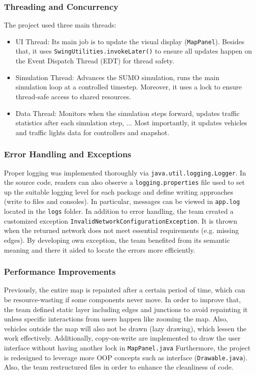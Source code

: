\documentclass[a4paper, 12pt]{article}
\begin{document}
\subsubsection{Threading and Concurrency}
The project used three main threads:
\begin{itemize}
    \item UI Thread: Its main job is to update the visual display (\verb|MapPanel|). Besides that, it uses \verb|SwingUtilities.invokeLater()| to ensure all updates happen on the Event Dispatch Thread (EDT) for thread safety.
    \item Simulation Thread: Advances the SUMO simulation, runs the main simulation loop at a controlled timestep. Moreover, it uses a lock to ensure thread-safe access to shared resources.
    \item Data Thread: Monitors when the simulation steps forward, updates traffic statistics after each simulation step, ... Most importantly, it updates vehicles and traffic lights data for controllers and snapshot.
\end{itemize}
\subsubsection{Error Handling and Exceptions}
Proper logging was implemented thoroughly via \verb|java.util.logging.Logger|. In the source code, readers can also observe a \verb|logging.properties| file used to set up the suitable logging level for each package and define writing approaches (write to files and consoles). In particular, messages can be viewed in \verb|app.log| located in the \verb|logs| folder. \newline
In addition to error handling, the team created a customized exception \verb|InvalidNetworkConfigurationException|. It is thrown when the returned network does not meet essential requirements (e.g. missing edges). By developing own exception, the team benefited from its semantic meaning and there it aided to locate the errors more efficiently.
\subsubsection{Performance Improvements}
Previously, the entire map is repainted after a certain period of time, which can be resource-wasting if some components never move. In order to improve that, the team defined static layer including edges and junctions to avoid repainting it unless specific interactions from users happen like zooming the map. Also, vehicles outside the map will also not be drawn (lazy drawing), which lessen the work effectively. \newline
Additionally, copy-on-write are implemented to draw the user interface without having another lock in \verb|MapPanel.java|
Furthermore, the project is redesigned to leverage more OOP concepts such as interface (\verb|Drawable.java|). Also, the team restructured files in order to enhance the cleanliness of code.
\end{document}
